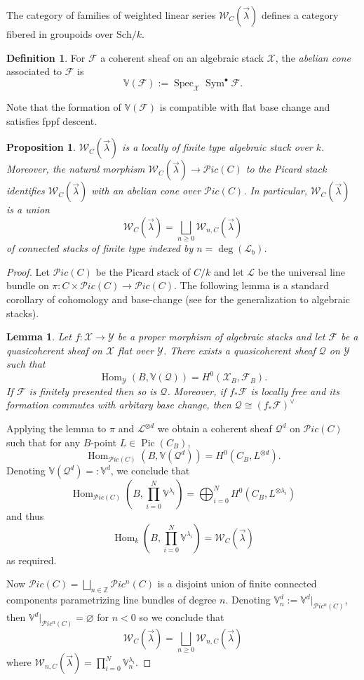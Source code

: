 \documentclass[a4paper,12pt]{amsart}
\newtheorem{lem}[thm]{Lemma}
\newtheorem{prop}[thm]{Proposition}
\theoremstyle{definition}
\newtheorem{defn}[thm]{Definition}
\newcommand{\bV}{\mathbb{V}}
\newcommand{\bZ}{\mathbb{Z}}
\newcommand{\cX}{\mathcal{X}}
\newcommand{\cY}{\mathcal{Y}}
\newcommand{\cF}{\mathcal{F}}
\newcommand{\cQ}{\mathcal{Q}}
\newcommand{\cL}{\mathcal{L}}
\newcommand{\cW}{\mathcal{W}}
\newcommand{\lambdavec}{{\vec{\lambda}}}
\DeclareMathOperator{\Spec}{Spec}
\DeclareMathOperator{\Pic}{Pic}
\DeclareMathOperator{\Sym}{Sym}
\DeclareMathOperator{\Hom}{Hom}
\newcommand{\Ppic}{\mathcal{P}ic}
\begin{document}
	The category of families of weighted linear series $\mathcal{W}_C(\lambdavec)$ defines a category fibered in groupoids over $\mathrm{Sch}/k$.
	
	\begin{defn} For $\cF$ a coherent sheaf on an algebraic stack $\cX$, the \emph{abelian cone} associated to $\cF$ is 
		$$
		\bV(\cF) := \Spec_{\cX} \Sym^\bullet \cF. 
		$$
	\end{defn}
	
	Note that the formation of $\bV(\cF)$ is compatible with flat base change and satisfies fppf descent. 
	
	\begin{prop} $\cW_C(\lambdavec)$ is a locally of finite type algebraic stack over $k$. Moreover, the natural morphism $\cW_C(\lambdavec) \to \Ppic(C)$ to the Picard stack identifies $\cW_C(\lambdavec)$ with an abelian cone over $\Ppic(C)$. In particular, $\cW_C(\lambdavec)$ is a union 
		$$
		\cW_C(\lambdavec) = \bigsqcup_{n \geq 0} \cW_{n,C}(\lambdavec)
		$$
		of connected stacks of finite type indexed by $n = \deg(\cL_b)$.
	\end{prop}
	
	\begin{proof} Let $\Ppic(C)$ be the Picard stack of $C/k$ and let $\cL$ be the universal line bundle on $\pi : C \times \Ppic(C) \to \Ppic(C)$. The following lemma is a standard corollary of cohomology and base-change (see \cite[Thm. D]{cohbase} for the generalization to algebraic stacks). 
		
		\begin{lem} Let $f : \cX \to \cY$ be a proper morphism of algebraic stacks and let $\cF$ be a quasicoherent sheaf on $\cX$ flat over $\cY$. There exists a quasicoherent sheaf $\cQ$ on $\cY$ such that
			$$
			\Hom_\cY(B, \bV(\cQ)) = H^0(\cX_B, \cF_B). 
			$$
			If $\cF$ is finitely presented then so is $\cQ$. Moreover, if $f_*\cF$ is locally free and its formation commutes with arbitary base change, then $\cQ \cong (f_*\cF)^{\vee}$
		\end{lem}
		
		Applying the lemma to $\pi$ and $\cL^{\otimes d}$ we obtain a coherent sheaf $\cQ^d$ on $\Ppic(C)$ such that for any $B$-point $L \in \Pic(C_B)$, 
		$$
		\Hom_{\Ppic(C)}(B, \bV(\cQ^d)) = H^0(C_B, L^{\otimes d}). 
		$$
		Denoting $\bV(\cQ^d) =: \bV^d$, we conclude that 
		$$
		\Hom_{\Ppic(C)}\left(B, \prod_{i = 0}^N \bV^{\lambda_i}\right) = \bigoplus_{i = 0}^N H^0(C_B, L^{\otimes \lambda_i})
		$$
		and thus
		$$
		\Hom_k\left(B, \prod_{i = 0}^N \bV^{\lambda_i}\right) = \cW_C(\lambdavec)
		$$
		as required. 
		
		Now $\Ppic(C) = \bigsqcup_{n \in \bZ} \Ppic^n(C)$ is a disjoint union of finite connected components parametrizing line bundles of degree $n$. Denoting $\bV^d_n := \bV^d|_{\Ppic^n(C)}$, then $\bV^d|_{\Ppic^n(C)} = \varnothing$ for $n < 0$ so we conclude that
		$$
		\cW_C(\lambdavec)= \bigsqcup_{n \geq 0} \cW_{n,C}(\lambdavec)
		$$
		where $\cW_{n,C}(\lambdavec) = \prod_{i = 0}^N \bV^{\lambda_i}_n$. 
	\end{proof} 
	
\end{document}
